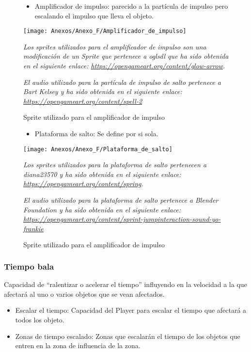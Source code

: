 \begin{figure}[h]
\begin{itemize}
\item
Amplificador de impulso: parecido a la partícula de impulso pero escalando el impulso que lleva el objeto.
\end{itemize}
\centering
\texttt{[image: Anexos/Anexo\_F/Amplificador\_de\_impulso]}
\caption{Sprite utilizado para el amplificador de impulso}
\raggedright
\textit{Los sprites utilizados para el amplificador de impulso son una modificación de un Sprite que pertenece a oglsdl que ha sido obtenida en el siguiente enlace: \url{https://opengameart.org/content/glow-arrow}.}

\textit{El audio utilizado para la partícula de impulso de salto pertenece a Bart Kelsey y ha sido obtenida en el siguiente enlace: \url{https://opengameart.org/content/spell-2}}
\end{figure}

\begin{figure}[h]
\begin{itemize}
\item
Plataforma de salto: Se define por si sola.
\end{itemize}
\centering
\texttt{[image: Anexos/Anexo\_F/Plataforma\_de\_salto]}
\caption{Sprite utilizado para el amplificador de impulso}
\raggedright
\textit{Los sprites utilizados para la plataforma de salto pertenecen a diana23570 y ha sido obtenida en el siguiente enlace: \url{https://opengameart.org/content/spring}.}

\textit{El audio utilizado para la plataforma de salto pertenece a Blender Foundation y ha sido obtenida en el siguiente enlace:  \url{https://opengameart.org/content/sprint-jumpinteraction-sound-yo-frankie}}
\end{figure}

\clearpage
\subsubsection{Tiempo bala}
Capacidad de “ralentizar o acelerar el tiempo” influyendo en la velocidad a la que afectará al uno o varios objetos que se vean afectados.
\begin{itemize}
\item
Escalar el tiempo: Capacidad del Player para escalar el tiempo que afectará a todos los objeto.
\item
Zonas de tiempo escalado: Zonas que escalarán el tiempo de los objetos que entren en la zona de influencia de la zona.
\end{itemize}

